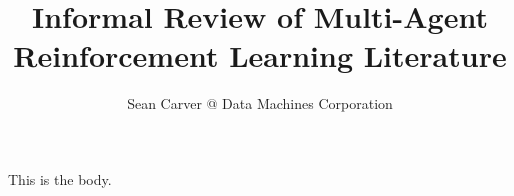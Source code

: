 \documentclass{article}
\title{Informal Review of Multi-Agent Reinforcement Learning Literature}
\author{Sean Carver @ Data Machines Corporation}
\begin{document}
\maketitle

This is the body.

\nocite{*}



\end{document}
